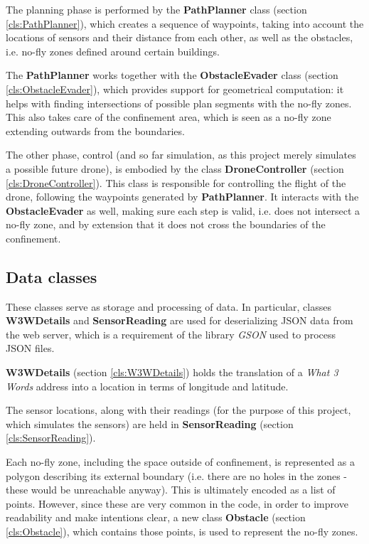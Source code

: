 \documentclass{article}
\newcommand{\sref}[1]{(section \ref{#1})}
\begin{document}
The planning phase is performed by the \textbf{PathPlanner} class \sref{cls:PathPlanner}, which creates a sequence of waypoints, taking into account the locations of sensors and their distance from each other, as well as the obstacles, i.e. no-fly zones defined around certain buildings.

The \textbf{PathPlanner} works together with the \textbf{ObstacleEvader} class \sref{cls:ObstacleEvader}, which provides support for geometrical computation: it helps with finding intersections of possible plan segments with the no-fly zones. This also takes care of the confinement area, which is seen as a no-fly zone extending outwards from the boundaries.

The other phase, control (and so far simulation, as this project merely simulates a possible future drone), is embodied by the class \textbf{DroneController} \sref{cls:DroneController}. This class is responsible for controlling the flight of the drone, following the waypoints generated by \textbf{PathPlanner}. It interacts with the \textbf{ObstacleEvader} as well, making sure each step is valid, i.e. does not intersect a no-fly zone, and by extension that it does not cross the boundaries of the confinement.

\subsection{Data classes}

These classes serve as storage and processing of data. In particular, classes \textbf{W3WDetails} and \textbf{SensorReading} are used for deserializing JSON data from the web server, which is a requirement of the library \textit{GSON} used to process JSON files.

\textbf{W3WDetails} \sref{cls:W3WDetails} holds the translation of a \textit{What 3 Words} address into a location in terms of longitude and latitude.

The sensor locations, along with their readings (for the purpose of this project, which simulates the sensors) are held in \textbf{SensorReading} \sref{cls:SensorReading}.

Each no-fly zone, including the space outside of confinement, is represented as a polygon describing its external boundary (i.e. there are no holes in the zones - these would be unreachable anyway). This is ultimately encoded as a list of points. However, since these are very common in the code, in order to improve readability and make intentions clear, a new class \textbf{Obstacle} \sref{cls:Obstacle}, which contains those points, is used to represent the no-fly zones. 
\end{document}
